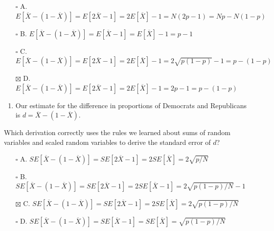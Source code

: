 \documentclass[
]{article}
\providecommand{\tightlist}{%
  \setlength{\itemsep}{0pt}\setlength{\parskip}{0pt}}
\begin{document}
\begin{itemize}
\tightlist
\item[$\square$]
  A.
  \(E \left [\overline{X} − (1 − \overline{X}) \right] = E \left [2 \overline{X} − 1 \right] = 2E \left [\overline{X} \right] - 1 = N(2p − 1) = Np − N(1 − p)\)
\item[$\square$]
  B.
  \(E \left [\overline{X} − (1 − \overline{X}) \right] = E \left [\overline{X} − 1 \right] = E \left [\overline{X} \right] − 1 = p − 1\)
\item[$\square$]
  C.
  \(E \left [\overline{X} − (1 − \overline{X}) \right] = E \left [2 \overline{X} − 1 \right] = 2E \left [\overline{X} \right] - 1 = 2 \sqrt{p(1 − p)} − 1 = p − (1 − p)\)
\item[$\boxtimes$]
  D.
  \(E \left [\overline{X} − (1 − \overline{X}) \right] = E \left [2 \overline{X} − 1 \right] = 2E \left [\overline{X} \right] - 1 = 2p − 1 = p − (1 − p)\)
\end{itemize}

\begin{enumerate}
\def\labelenumi{\arabic{enumi}.}
\setcounter{enumi}{7}
\tightlist
\item
  Our estimate for the difference in proportions of Democrats and
  Republicans is \(d = \overline{X} − (1 − \overline{X})\).
\end{enumerate}

Which derivation correctly uses the rules we learned about sums of
random variables and scaled random variables to derive the standard
error of \(d\)?

\begin{itemize}
\tightlist
\item[$\square$]
  A.
  \(SE \left [\overline{X} − (1 − \overline{X}) \right] = SE \left [2 \overline{X} − 1 \right] = 2SE \left [\overline{X} \right] = 2 \sqrt{p/N}\)
\item[$\square$]
  B.
  \(SE \left [\overline{X} − (1 − \overline{X}) \right] = SE \left [2 \overline{X} − 1 \right] = 2SE \left [\overline{X} - 1 \right] = 2 \sqrt{p(1 − p)/N} − 1\)
\item[$\boxtimes$]
  C.
  \(SE \left [\overline{X} − (1 − \overline{X}) \right] = SE \left [2 \overline{X} − 1 \right] = 2SE \left [\overline{X} \right] = 2 \sqrt{p(1 − p)/N}\)
\item[$\square$]
  D.
  \(SE \left [\overline{X} − (1 − \overline{X}) \right] = SE \left [\overline{X} − 1 \right] = SE\left [\overline{X} \right] = \sqrt{p(1 − p)/N}\)
\end{itemize}
\end{document}
